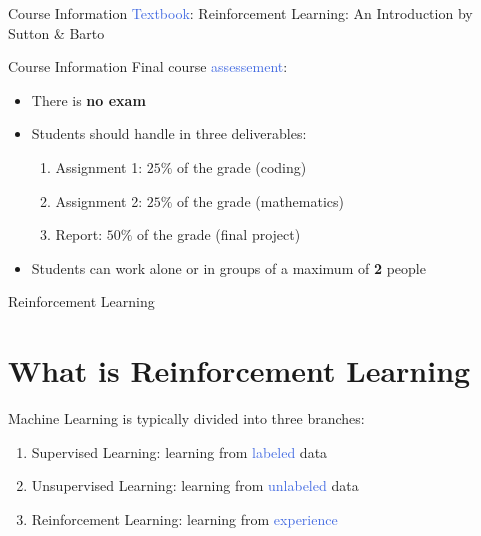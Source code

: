 \documentclass{beamer}
\begin{document}
\begin{frame}{Course Information}
	\textcolor{RoyalBlue}{Textbook}: Reinforcement Learning: An Introduction by Sutton \& Barto
\end{frame}

\begin{frame}{Course Information}
	Final course \textcolor{RoyalBlue}{assessement}:
	\begin{itemize}
		\item There is \textbf{no exam}
		\item Students should handle in three deliverables:
			\begin{enumerate}
				\item Assignment 1: $25\%$ of the grade (coding)
				\item Assignment 2: $25\%$ of the grade (mathematics)
				\item Report: $50\%$ of the grade (final project)
			\end{enumerate}
		\item Students can work alone or in groups of a maximum of \textbf{2} people 
	\end{itemize}

\end{frame}







\begin{frame}{Reinforcement Learning}
	\section{What is Reinforcement Learning}
	
	Machine Learning is typically divided into three branches:

	\begin{enumerate}
		\item Supervised Learning: learning from \textcolor{RoyalBlue}{labeled} data
		\item Unsupervised Learning: learning from \textcolor{RoyalBlue}{unlabeled} data
		\item Reinforcement Learning: learning from \textcolor{RoyalBlue}{experience}
	\end{enumerate}

\end{frame}
\end{document}
